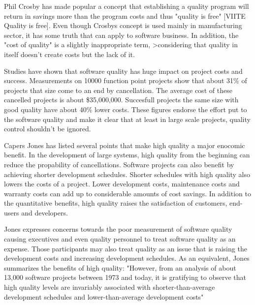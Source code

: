 Phil Crosby has made popular a concept that establishing a quality program will return in savings more than the program costs and thus "quality is free" [VIITE Quality is free]. Even though Crosbys concept is used mainly in manufacturing sector, it has some truth that can apply to software business.  In addition, the "cost of quality" is a slightly inappropriate term, >considering that quality in itself doesn't create costs but the lack of it. 

Studies have shown that software quality has huge impact on project costs and success. Measurements on 10000 function point projects show that about 31\% of projects that size come to an end by cancellation. The average cost of these cancelled projects is about \$35,000,000. Succesfull projects the same size with good quality have about 40\% lower costs. These figures endorse the effort put to the software quality and make it clear that at least in large scale projects, quality control shouldn't be ignored.

Capers Jones has listed several points that make high quality a major enocomic benefit. In the development of large systems, high quality from the beginning can reduce the propability of cancellations. Software projects can also benefit by achieving shorter development schedules. Shorter schedules with high quality also lowers the costs of a project. Lower development costs, maintenance costs and warranty costs can add up to considerable amounts of cost savings. In addition to the quantitative benefits, high quality raises the satisfaction of customers, end-users and developers. 

Jones expresses concerns towards the poor measurement of software quality causing executives and even quality personnel to treat software quality as an expense. Those participants may also treat quality as an issue that is raising the development costs and increasing development schedules. As an equivalent, Jones summarizes the benefits of high quality: "However, from an analysis of about 13,000 software projects between 1973 and today, it is gratifying to observe that high quality levels are invariably associated with shorter-than-average development schedules and lower-than-average development costs"~\cite{jones2011economics}

 
 
 
 